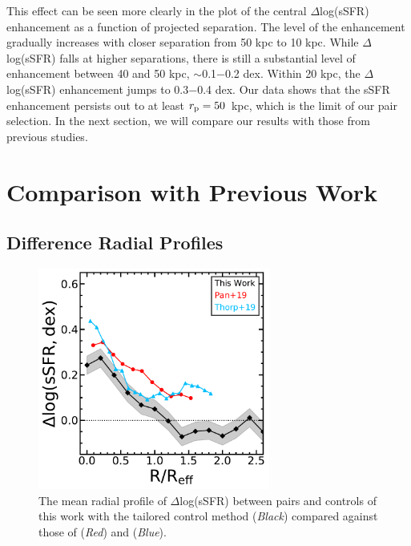 \documentclass[iop,revtex4,twocolumn,apj,numberedappendix,appendixfloats]{emulateapj}
\begin{document}
This effect can be seen more clearly in the plot of the central $\Delta$log(sSFR) enhancement as a function of projected separation. The level of the enhancement gradually increases with closer separation from 50 kpc to 10 kpc. While $\Delta$log(sSFR) falls at higher separations, there is still a substantial level of enhancement between 40 and 50 kpc, $\sim$0.1$-$0.2 dex. Within 20 kpc, the $\Delta$log(sSFR) enhancement jumps to 0.3$-$0.4 dex. Our data shows that the sSFR enhancement persists out to at least $r_{\rm p} = 50$~kpc, which is the limit of our pair selection. In the next section, we will compare our results with those from previous studies.

\section{Comparison with Previous Work}\label{sec:disc}

\subsection{Difference Radial Profiles}

\begin{figure}
\centering
\includegraphics[width=3in]{fig/prof_comp.pdf}
\caption[]{The mean radial profile of $\Delta$log(sSFR) between pairs and controls of this work with the tailored control method ({\it Black}) compared against those of \citet{Pan:2019} ({\it Red}) and \citet{Thorp:2019} ({\it Blue}).}
\label{fig:prof_comp}
\end{figure}
\end{document}

